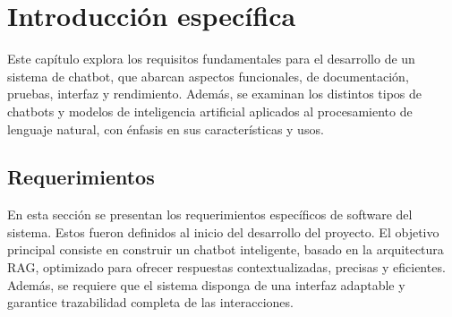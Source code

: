 
\chapter{Introducción específica}  
 
 
Este capítulo explora los requisitos fundamentales para el desarrollo de un sistema de chatbot, que abarcan aspectos funcionales, de documentación, pruebas, interfaz y rendimiento. Además, se examinan los distintos tipos de chatbots y modelos de inteligencia artificial aplicados al procesamiento de lenguaje natural, con énfasis en sus características y usos.


\section{Requerimientos}

En esta sección se presentan los requerimientos específicos de software del sistema. Estos fueron definidos al inicio del desarrollo del proyecto. El objetivo principal consiste en construir un chatbot inteligente, basado en la arquitectura RAG, optimizado para ofrecer respuestas contextualizadas, precisas y eficientes. Además, se requiere que el sistema disponga de una interfaz adaptable y garantice trazabilidad completa de las interacciones.

